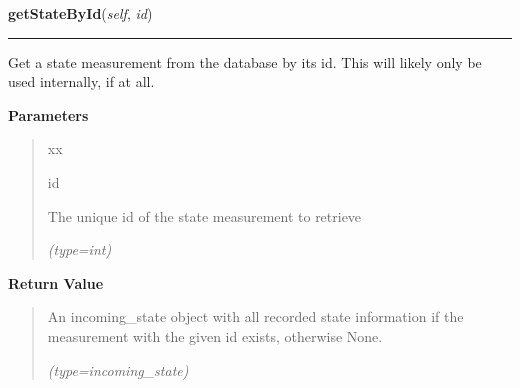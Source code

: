 \hspace{.8\funcindent}\begin{boxedminipage}{\funcwidth}

    \raggedright \textbf{getStateById}(\textit{self}, \textit{id})

    \vspace{-1.5ex}

    \rule{\textwidth}{0.5\fboxrule}
\setlength{\parskip}{2ex}
    Get a state measurement from the database by its id. This will likely 
    only be used internally, if at all.

\setlength{\parskip}{1ex}
      \textbf{Parameters}
      \vspace{-1ex}

      \begin{quote}
        \begin{Ventry}{xx}

          \item[id]

          The unique id of the state measurement to retrieve

            {\it (type=int)}

        \end{Ventry}

      \end{quote}

      \textbf{Return Value}
    \vspace{-1ex}

      \begin{quote}
      An incoming\_state object with all recorded state information if the 
      measurement with the given id exists, otherwise None.

      {\it (type=incoming\_state)}

      \end{quote}

    \end{boxedminipage}

    \label{src:dao:incoming_state_dao:IncomingStateDAO:getStateByClosestTS}

    \vspace{0.5ex}

